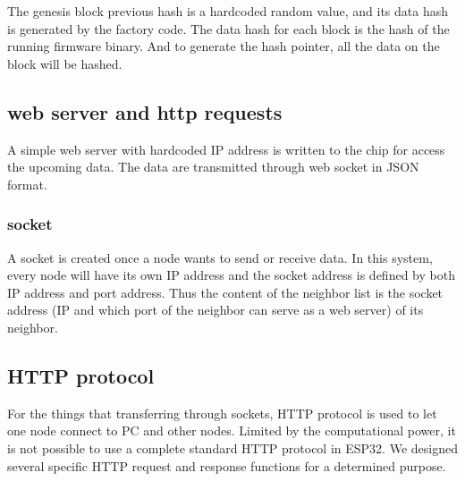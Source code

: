 \documentclass{article}
\begin{document}
         The genesis block previous hash is a hardcoded random value, and its data hash is generated by the factory code. The data hash for each block is the hash of the running firmware binary. And to generate the hash pointer, all the data on the block will be hashed.

    \subsection{web server and http requests}
        A simple web server with hardcoded IP address is written to the chip for access the upcoming data. The data are transmitted through web socket in JSON format.

        \subsubsection{socket}
        A socket is created once a node wants to send or receive data. In this system, every node will have its own IP address and the socket address is defined by both IP address and port address.
        Thus the content of the neighbor list is the socket address (IP and which port of the neighbor can serve as a web server) of its neighbor.

        \subsection{HTTP protocol}
        For the things that transferring through sockets, HTTP protocol is used to let one node connect to PC and other nodes.
        Limited by the computational power, it is not possible to use a complete standard HTTP protocol in ESP32. We designed several specific HTTP request and response functions for a determined purpose.
\end{document}
